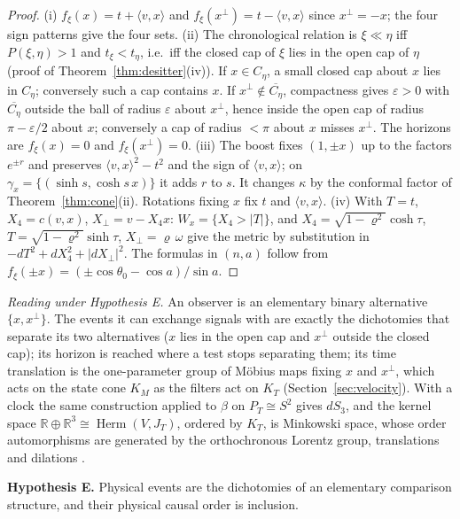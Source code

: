 \documentclass[aps,pra,onecolumn,superscriptaddress,nofootinbib,10pt]{revtex4-2}
\theoremstyle{definition}
\theoremstyle{remark}
\newcommand{\R}{\mathbb{R}}
\newcommand{\Herm}{\operatorname{Herm}}
\newcommand{\ip}[2]{\langle #1,#2\rangle}
\begin{document}
\begin{proof}
(i) $f_\xi(x)=t+\ip vx$ and $f_\xi(x^\perp)=t-\ip vx$ since $x^\perp=-x$; the four sign patterns give the
four sets.  (ii) The chronological relation is $\xi\ll\eta$ iff $P(\xi,\eta)>1$ and $t_\xi<t_\eta$, i.e.\ iff the
closed cap of $\xi$ lies in the open cap of $\eta$ (proof of Theorem~\ref{thm:desitter}(iv)).  If $x\in C_\eta$, a
small closed cap about $x$ lies in $C_\eta$; conversely such a cap contains $x$.  If
$x^\perp\notin\overline{C_\eta}$, compactness gives $\varepsilon>0$ with $\overline{C_\eta}$ outside the ball of
radius $\varepsilon$ about $x^\perp$, hence inside the open cap of radius $\pi-\varepsilon/2$ about $x$;
conversely a cap of radius $<\pi$ about $x$ misses $x^\perp$.  The horizons are $f_\xi(x)=0$ and
$f_\xi(x^\perp)=0$.  (iii) The boost fixes $(1,\pm x)$ up to the factors $e^{\pm r}$ and preserves
$\ip vx^2-t^2$ and the sign of $\ip vx$; on $\gamma_x=\{(\sinh s,\cosh s\,x)\}$ it adds $r$ to $s$.  It
changes $\kappa$ by the conformal factor of Theorem~\ref{thm:cone}(ii).  Rotations fixing $x$ fix $t$ and
$\ip vx$.  (iv) With $T=t$, $X_4=c(v,x)$, $X_\perp=v-X_4x$: $W_x=\{X_4>\lvert T\rvert\}$, and
$X_4=\sqrt{1-\varrho^2}\cosh\tau$, $T=\sqrt{1-\varrho^2}\sinh\tau$, $X_\perp=\varrho\,\omega$ give the metric by
substitution in $-dT^2+dX_4^2+\lvert dX_\perp\rvert^2$.  The formulas in $(n,a)$ follow from
$f_\xi(\pm x)=(\pm\cos\theta_0-\cos a)/\sin a$.
\end{proof}

\noindent\emph{Reading under Hypothesis E.}  An observer is an elementary binary alternative
$\{x,x^\perp\}$.  The events it can exchange signals with are exactly the dichotomies that separate its two
alternatives ($x$ lies in the open cap and $x^\perp$ outside the closed cap); its horizon is reached where a test stops separating them;
its time translation is the one-parameter group of M\"obius maps fixing $x$ and $x^\perp$, which acts on
the state cone $K_M$ as the filters act on $K_T$ (Section~\ref{sec:velocity}).  With a clock the same
construction applied to $\beta$ on $P_T\cong S^2$ gives $dS_3$, and the kernel space
$\R\oplus\R^3\cong\Herm(V,J_T)$, ordered by $K_T$, is Minkowski space, whose order automorphisms are
generated by the orthochronous Lorentz group, translations and dilations \cite{AO53,Zeeman}.

\smallskip\noindent\textbf{Hypothesis E.}  Physical events are the dichotomies of an elementary
comparison structure, and their physical causal order is inclusion.
\end{document}
